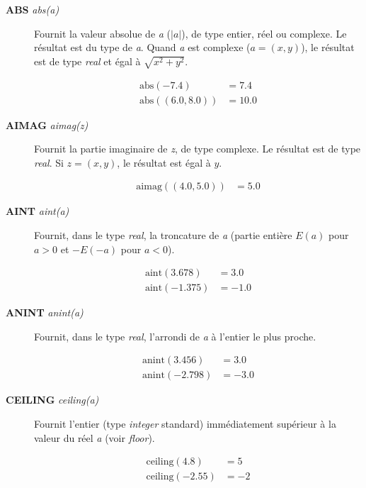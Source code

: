 \documentclass[a4paper,twoside]{article}
\begin{document}
\begin{description}
\item[\textbf{ABS} \emph{abs(a)}]  Fournit la valeur absolue de \emph{a} ($\left|a\right|$), de type entier, réel ou complexe. Le résultat est du type de \emph{a}. Quand \emph{a} est complexe ($a=(x,y)$), le résultat est de type \emph{real} et égal à $\sqrt{x^{2}+y^{2}}$. 
\begin{exemple}
\begin{align}
\mathrm{abs}(-7.4) &= 7.4\\
\mathrm{abs}((6.0,8.0))&= 10.0
\end{align}
\end{exemple}

\item[\textbf{AIMAG} \emph{aimag(z)}] Fournit la partie imaginaire de \emph{z}, de type complexe. Le résultat est de type \emph{real}. Si $z=(x,y)$, le résultat est égal à $y$. 
\begin{exemple}
\begin{align}
\mathrm{aimag}((4.0,5.0))&= 5.0
\end{align}
\end{exemple}

\item[\textbf{AINT} \emph{aint(a)}] Fournit, dans le type \emph{real}, la troncature de \emph{a} (partie entière $E(a)$ pour $a>0$ et $-E(-a)$ pour $a<0$). 
\begin{exemple}
\begin{align}
\mathrm{aint}(3.678) &= 3.0\\
\mathrm{aint}(-1.375) &= -1.0
\end{align}
\end{exemple}

\item[\textbf{ANINT} \emph{anint(a)}] Fournit, dans le type \emph{real}, l'arrondi de \emph{a} à l'entier le plus proche. 
\begin{exemple}
\begin{align}
\mathrm{anint}(3.456) &= 3.0\\
\mathrm{anint}(-2.798) &= -3.0
\end{align}
\end{exemple}

\item[\textbf{CEILING} \emph{ceiling(a)}] Fournit l'entier (type \emph{integer} standard) immédiatement supérieur à la valeur du réel \emph{a} (voir \emph{floor}).
\begin{exemple}
\begin{align}
\mathrm{ceiling}(4.8) &= 5\\
\mathrm{ceiling}(-2.55) &= -2
\end{align}
\end{exemple}


\end{description}
\end{document}
